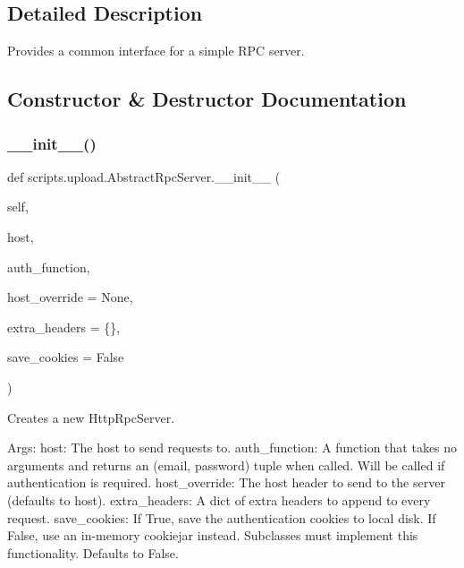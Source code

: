\subsection{Detailed Description}
\begin{DoxyVerb}Provides a common interface for a simple RPC server.\end{DoxyVerb}
 

\subsection{Constructor \& Destructor Documentation}
\mbox{\label{classscripts_1_1upload_1_1_abstract_rpc_server_afac39d1c463d3595ccfbbe0aabd47aa9}} 
\subsubsection{\texorpdfstring{\_\_init\_\_()}{\_\_init\_\_()}}
{\footnotesize\ttfamily def scripts.\+upload.\+Abstract\+Rpc\+Server.\+\_\+\+\_\+init\+\_\+\+\_\+ (\begin{DoxyParamCaption}\item[{}]{self,  }\item[{}]{host,  }\item[{}]{auth\+\_\+function,  }\item[{}]{host\+\_\+override = {\ttfamily None},  }\item[{}]{extra\+\_\+headers = {\ttfamily \{\}},  }\item[{}]{save\+\_\+cookies = {\ttfamily False} }\end{DoxyParamCaption})}

\begin{DoxyVerb}Creates a new HttpRpcServer.

Args:
  host: The host to send requests to.
  auth_function: A function that takes no arguments and returns an
(email, password) tuple when called. Will be called if authentication
is required.
  host_override: The host header to send to the server (defaults to host).
  extra_headers: A dict of extra headers to append to every request.
  save_cookies: If True, save the authentication cookies to local disk.
If False, use an in-memory cookiejar instead.  Subclasses must
implement this functionality.  Defaults to False.
\end{DoxyVerb}
 

